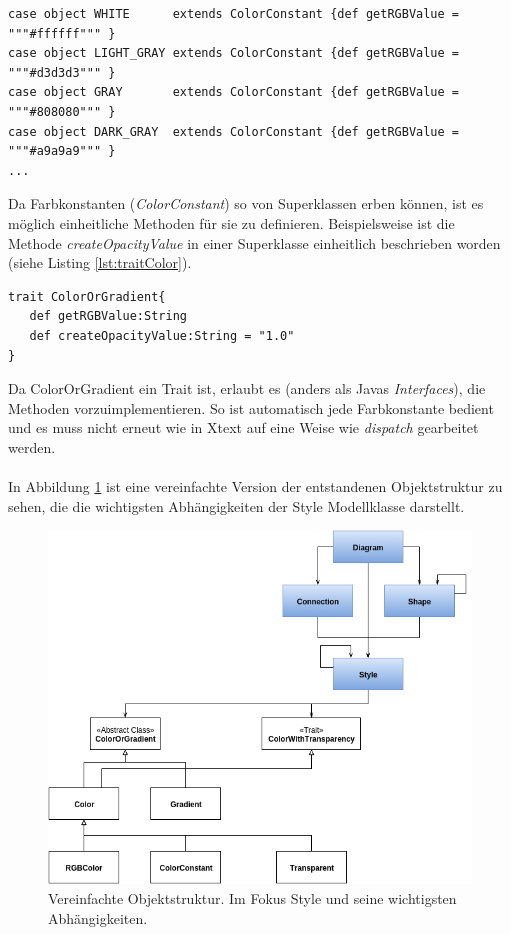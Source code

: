 \begin{lstlisting}[style=scala, caption = {Auszug aus Code ColorConstants als case objects}, label = {lst:caseobjects}]
case object WHITE      extends ColorConstant {def getRGBValue = """#ffffff""" }
case object LIGHT_GRAY extends ColorConstant {def getRGBValue = """#d3d3d3""" }
case object GRAY       extends ColorConstant {def getRGBValue = """#808080""" }
case object DARK_GRAY  extends ColorConstant {def getRGBValue = """#a9a9a9""" }
...
\end{lstlisting}Da Farbkonstanten (\textit{ColorConstant}) so von Superklassen erben können, ist es möglich einheitliche Methoden für sie zu definieren.
Beispielsweise ist die Methode \textit{createOpacityValue} in einer Superklasse einheitlich beschrieben worden (siehe Listing \ref{lst:traitColor}).\begin{lstlisting}[style=scala, caption = {Auszug aus Code Trait ColorOrGradient}, label = {lst:traitColor}]
trait ColorOrGradient{
   def getRGBValue:String
   def createOpacityValue:String = "1.0"
}
\end{lstlisting}Da ColorOrGradient ein Trait ist, erlaubt es (anders als Javas \textit{Interfaces}), die Methoden vorzuimplementieren. So ist automatisch jede Farbkonstante bedient und es muss nicht erneut wie in Xtext auf eine Weise wie \textit{dispatch} gearbeitet werden.\\\\In Abbildung \ref{objectstructureStyle} ist eine vereinfachte Version der entstandenen Objektstruktur zu sehen, die die wichtigsten Abhängigkeiten der Style Modellklasse darstellt.
\begin{figure}[H]
\begin{center}
\includegraphics[width=\textwidth]{Bilder/styleObjektstruktur.png}
\caption{Vereinfachte Objektstruktur. Im Fokus Style und seine wichtigsten Abhängigkeiten.}
\label{objectstructureStyle}
\end{center}
\end{figure}
